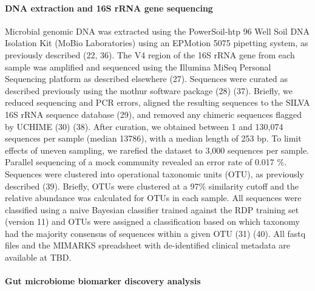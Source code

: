 \documentclass[11pt,]{article}
\let\oldparagraph\paragraph
\renewcommand{\paragraph}[1]{\oldparagraph{#1}\mbox{}}
\begin{document}
\paragraph{DNA extraction and 16S rRNA gene
sequencing}\label{dna-extraction-and-16s-rrna-gene-sequencing}

Microbial genomic DNA was extracted using the PowerSoil-htp 96 Well Soil
DNA Isolation Kit (MoBio Laboratories) using an EPMotion 5075 pipetting
system, as previously described (22, 36). The V4 region of the 16S rRNA
gene from each sample was amplified and sequenced using the Illumina
MiSeq Personal Sequencing platform as described elsewhere (27).
Sequences were curated as described previously using the mothur software
package (28) (37). Briefly, we reduced sequencing and PCR errors,
aligned the resulting sequences to the SILVA 16S rRNA sequence database
(29), and removed any chimeric sequences flagged by UCHIME (30) (38).
After curation, we obtained between 1 and 130,074 sequences per sample
(median 13786), with a median length of 253 bp. To limit effects of
uneven sampling, we rarefied the dataset to 3,000 sequences per sample.
Parallel sequencing of a mock community revealed an error rate of 0.017
\%. Sequences were clustered into operational taxonomic units (OTU), as
previously described (39). Briefly, OTUs were clustered at a 97\%
similarity cutoff and the relative abundance was calculated for OTUs in
each sample. All sequences were classified using a naive Bayesian
classifier trained against the RDP training set (version 11) and OTUs
were assigned a classification based on which taxonomy had the majority
consensus of sequences within a given OTU (31) (40). All fastq files and
the MIMARKS spreadsheet with de-identified clinical metadata are
available at TBD.

\paragraph{Gut microbiome biomarker discovery
analysis}\label{gut-microbiome-biomarker-discovery-analysis}
\end{document}
